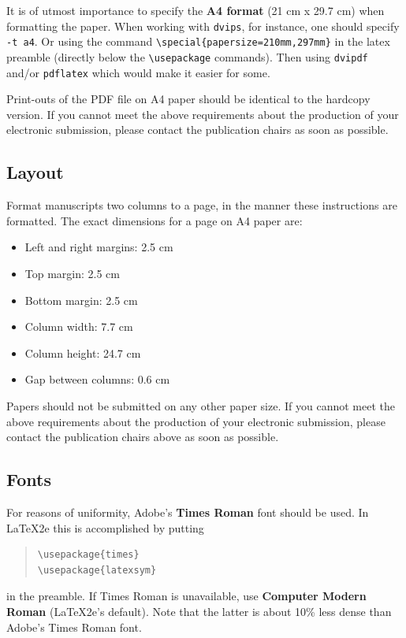 \documentclass[11pt,a4paper]{article}
\begin{document}
It is of utmost importance to specify the \textbf{A4 format} (21 cm
x 29.7 cm) when formatting the paper. When working with
{\tt dvips}, for instance, one should specify {\tt -t a4}.
Or using the command \verb|\special{papersize=210mm,297mm}| in the latex
preamble (directly below the \verb|\usepackage| commands). Then using 
{\tt dvipdf} and/or {\tt pdflatex} which would make it easier for some.

Print-outs of the PDF file on A4 paper should be identical to the
hardcopy version. If you cannot meet the above requirements about the
production of your electronic submission, please contact the
publication chairs as soon as possible.

\subsection{Layout}
\label{ssec:layout}

Format manuscripts two columns to a page, in the manner these
instructions are formatted. The exact dimensions for a page on A4
paper are:

\begin{itemize}
\item Left and right margins: 2.5 cm
\item Top margin: 2.5 cm
\item Bottom margin: 2.5 cm
\item Column width: 7.7 cm
\item Column height: 24.7 cm
\item Gap between columns: 0.6 cm
\end{itemize}

\noindent Papers should not be submitted on any other paper size.
 If you cannot meet the above requirements about the production of 
 your electronic submission, please contact the publication chairs 
 above as soon as possible.

\subsection{Fonts}

For reasons of uniformity, Adobe's {\bf Times Roman} font should be
used. In \LaTeX2e{} this is accomplished by putting

\begin{quote}
\begin{verbatim}
\usepackage{times}
\usepackage{latexsym}
\end{verbatim}
\end{quote}
in the preamble. If Times Roman is unavailable, use {\bf Computer
  Modern Roman} (\LaTeX2e{}'s default).  Note that the latter is about
  10\% less dense than Adobe's Times Roman font.
\end{document}

